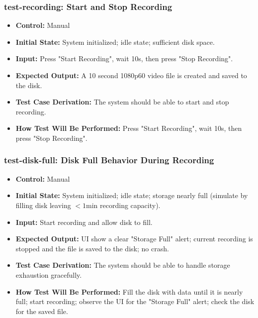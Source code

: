 \documentclass[12pt, titlepage]{article}
\begin{document}
\subsubsection*{test-recording: Start and Stop Recording}
\begin{itemize}
  \item \textbf{Control:} Manual
  \item \textbf{Initial State:} System initialized; idle state; sufficient disk space.
  \item \textbf{Input:} Press "Start Recording", wait 10s, then press "Stop Recording".
  \item \textbf{Expected Output:} A 10 second 1080p60 video file is created and saved to the disk.
  \item \textbf{Test Case Derivation:} The system should be able to start and stop recording.
  \item \textbf{How Test Will Be Performed:} Press "Start Recording", wait 10s, then press "Stop Recording".
\end{itemize}

\subsubsection*{test-disk-full: Disk Full Behavior During Recording}
\begin{itemize}
  \item \textbf{Control:} Manual
  \item \textbf{Initial State:} System initialized; idle state; storage nearly full (simulate by filling disk leaving $<1$min recording capacity).
  \item \textbf{Input:} Start recording and allow disk to fill.
  \item \textbf{Expected Output:} UI show a clear "Storage Full" alert; current recording is stopped and the file is saved to the disk; no crash.
  \item \textbf{Test Case Derivation:} The system should be able to handle storage exhaustion gracefully.
  \item \textbf{How Test Will Be Performed:} Fill the disk with data until it is nearly full; start recording; observe the UI for the "Storage Full" alert; check the disk for the saved file.
\end{itemize}
\end{document}
